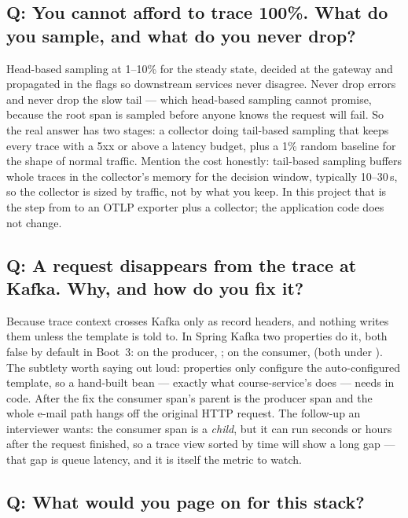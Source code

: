 \subsection*{Q: You cannot afford to trace 100\%. What do you sample, and what do you never drop?}

Head-based sampling at 1--10\% for the steady state, decided at the
gateway and propagated in the  flags so downstream
services never disagree. Never drop errors and never drop the slow
tail --- which head-based sampling cannot promise, because the root
span is sampled before anyone knows the request will fail. So the real
answer has two stages: a collector doing tail-based sampling that keeps
every trace with a 5xx or above a latency budget, plus a 1\% random
baseline for the shape of normal traffic. Mention the cost honestly:
tail-based sampling buffers whole traces in the collector's memory for
the decision window, typically 10--30\,s, so the collector is sized by
traffic, not by what you keep. In this project that is the step from
 to an OTLP exporter plus a collector; the
application code does not change.

\subsection*{Q: A request disappears from the trace at Kafka. Why, and how do you fix it?}

Because trace context crosses Kafka only as record headers, and
nothing writes them unless the template is told to. In Spring Kafka
two properties do it, both false by default in Boot~3: on the
producer, ; on the consumer,
 (both under ).
The subtlety worth
saying out loud: properties only configure the auto-configured
template, so a hand-built  bean --- exactly what
course-service's  does --- needs
 in code. After the fix the consumer
span's parent is the producer span and the whole e-mail path hangs off
the original HTTP request. The follow-up an interviewer wants: the
consumer span is a \emph{child}, but it can run seconds or hours after
the request finished, so a trace view sorted by time will show a long
gap --- that gap is queue latency, and it is itself the metric to
watch.

\subsection*{Q: What would you page on for this stack?}

